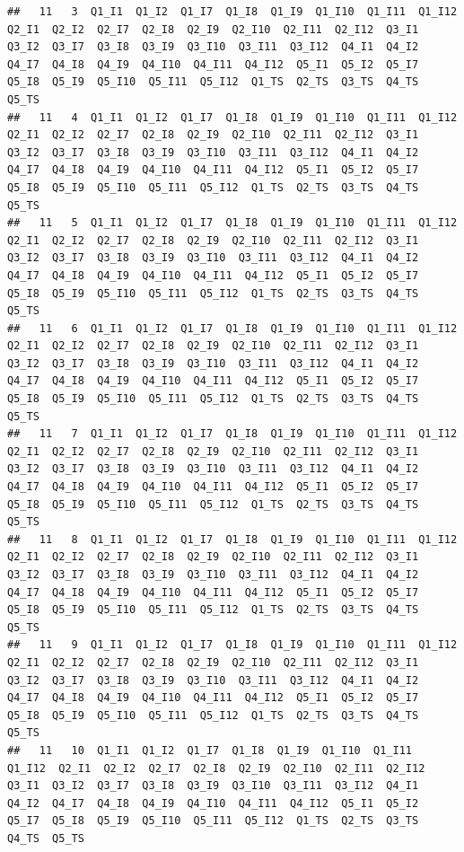 \documentclass[]{book}
\begin{document}
\begin{verbatim}
##   11   3  Q1_I1  Q1_I2  Q1_I7  Q1_I8  Q1_I9  Q1_I10  Q1_I11  Q1_I12  Q2_I1  Q2_I2  Q2_I7  Q2_I8  Q2_I9  Q2_I10  Q2_I11  Q2_I12  Q3_I1  Q3_I2  Q3_I7  Q3_I8  Q3_I9  Q3_I10  Q3_I11  Q3_I12  Q4_I1  Q4_I2  Q4_I7  Q4_I8  Q4_I9  Q4_I10  Q4_I11  Q4_I12  Q5_I1  Q5_I2  Q5_I7  Q5_I8  Q5_I9  Q5_I10  Q5_I11  Q5_I12  Q1_TS  Q2_TS  Q3_TS  Q4_TS  Q5_TS
##   11   4  Q1_I1  Q1_I2  Q1_I7  Q1_I8  Q1_I9  Q1_I10  Q1_I11  Q1_I12  Q2_I1  Q2_I2  Q2_I7  Q2_I8  Q2_I9  Q2_I10  Q2_I11  Q2_I12  Q3_I1  Q3_I2  Q3_I7  Q3_I8  Q3_I9  Q3_I10  Q3_I11  Q3_I12  Q4_I1  Q4_I2  Q4_I7  Q4_I8  Q4_I9  Q4_I10  Q4_I11  Q4_I12  Q5_I1  Q5_I2  Q5_I7  Q5_I8  Q5_I9  Q5_I10  Q5_I11  Q5_I12  Q1_TS  Q2_TS  Q3_TS  Q4_TS  Q5_TS
##   11   5  Q1_I1  Q1_I2  Q1_I7  Q1_I8  Q1_I9  Q1_I10  Q1_I11  Q1_I12  Q2_I1  Q2_I2  Q2_I7  Q2_I8  Q2_I9  Q2_I10  Q2_I11  Q2_I12  Q3_I1  Q3_I2  Q3_I7  Q3_I8  Q3_I9  Q3_I10  Q3_I11  Q3_I12  Q4_I1  Q4_I2  Q4_I7  Q4_I8  Q4_I9  Q4_I10  Q4_I11  Q4_I12  Q5_I1  Q5_I2  Q5_I7  Q5_I8  Q5_I9  Q5_I10  Q5_I11  Q5_I12  Q1_TS  Q2_TS  Q3_TS  Q4_TS  Q5_TS
##   11   6  Q1_I1  Q1_I2  Q1_I7  Q1_I8  Q1_I9  Q1_I10  Q1_I11  Q1_I12  Q2_I1  Q2_I2  Q2_I7  Q2_I8  Q2_I9  Q2_I10  Q2_I11  Q2_I12  Q3_I1  Q3_I2  Q3_I7  Q3_I8  Q3_I9  Q3_I10  Q3_I11  Q3_I12  Q4_I1  Q4_I2  Q4_I7  Q4_I8  Q4_I9  Q4_I10  Q4_I11  Q4_I12  Q5_I1  Q5_I2  Q5_I7  Q5_I8  Q5_I9  Q5_I10  Q5_I11  Q5_I12  Q1_TS  Q2_TS  Q3_TS  Q4_TS  Q5_TS
##   11   7  Q1_I1  Q1_I2  Q1_I7  Q1_I8  Q1_I9  Q1_I10  Q1_I11  Q1_I12  Q2_I1  Q2_I2  Q2_I7  Q2_I8  Q2_I9  Q2_I10  Q2_I11  Q2_I12  Q3_I1  Q3_I2  Q3_I7  Q3_I8  Q3_I9  Q3_I10  Q3_I11  Q3_I12  Q4_I1  Q4_I2  Q4_I7  Q4_I8  Q4_I9  Q4_I10  Q4_I11  Q4_I12  Q5_I1  Q5_I2  Q5_I7  Q5_I8  Q5_I9  Q5_I10  Q5_I11  Q5_I12  Q1_TS  Q2_TS  Q3_TS  Q4_TS  Q5_TS
##   11   8  Q1_I1  Q1_I2  Q1_I7  Q1_I8  Q1_I9  Q1_I10  Q1_I11  Q1_I12  Q2_I1  Q2_I2  Q2_I7  Q2_I8  Q2_I9  Q2_I10  Q2_I11  Q2_I12  Q3_I1  Q3_I2  Q3_I7  Q3_I8  Q3_I9  Q3_I10  Q3_I11  Q3_I12  Q4_I1  Q4_I2  Q4_I7  Q4_I8  Q4_I9  Q4_I10  Q4_I11  Q4_I12  Q5_I1  Q5_I2  Q5_I7  Q5_I8  Q5_I9  Q5_I10  Q5_I11  Q5_I12  Q1_TS  Q2_TS  Q3_TS  Q4_TS  Q5_TS
##   11   9  Q1_I1  Q1_I2  Q1_I7  Q1_I8  Q1_I9  Q1_I10  Q1_I11  Q1_I12  Q2_I1  Q2_I2  Q2_I7  Q2_I8  Q2_I9  Q2_I10  Q2_I11  Q2_I12  Q3_I1  Q3_I2  Q3_I7  Q3_I8  Q3_I9  Q3_I10  Q3_I11  Q3_I12  Q4_I1  Q4_I2  Q4_I7  Q4_I8  Q4_I9  Q4_I10  Q4_I11  Q4_I12  Q5_I1  Q5_I2  Q5_I7  Q5_I8  Q5_I9  Q5_I10  Q5_I11  Q5_I12  Q1_TS  Q2_TS  Q3_TS  Q4_TS  Q5_TS
##   11   10  Q1_I1  Q1_I2  Q1_I7  Q1_I8  Q1_I9  Q1_I10  Q1_I11  Q1_I12  Q2_I1  Q2_I2  Q2_I7  Q2_I8  Q2_I9  Q2_I10  Q2_I11  Q2_I12  Q3_I1  Q3_I2  Q3_I7  Q3_I8  Q3_I9  Q3_I10  Q3_I11  Q3_I12  Q4_I1  Q4_I2  Q4_I7  Q4_I8  Q4_I9  Q4_I10  Q4_I11  Q4_I12  Q5_I1  Q5_I2  Q5_I7  Q5_I8  Q5_I9  Q5_I10  Q5_I11  Q5_I12  Q1_TS  Q2_TS  Q3_TS  Q4_TS  Q5_TS

\end{verbatim}
\end{document}
